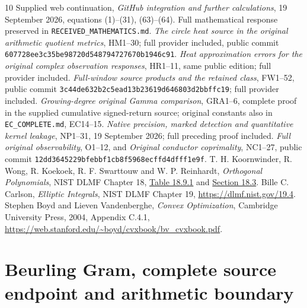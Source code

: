\begin{thebibliography}{10}
 Supplied web continuation, \emph{GitHub integration and further
calculations}, 19 September 2026, equations (1)--(31), (63)--(64).
Full mathematical response preserved in \texttt{RECEIVED\_MATHEMATICS.md}.
 \emph{The circle heat source in the original arithmetic quotient
metrics}, HM1--30; full provider included, public commit
\texttt{607728ee3c35be98720d548794727670b1946c91}.
 \emph{Heat approximation errors for the original complex
observation responses}, HR1--11, same public edition; full provider included.
 \emph{Full-window source products and the retained class},
FW1--52, public commit \texttt{3c44de632b2c5ead13b23619d646803d2bbffc19};
full provider included.
 \emph{Growing-degree original Gamma comparison}, GRA1--6,
complete proof in the supplied cumulative signed-return source;
original constants also in \texttt{EC\_COMPLETE.md}, EC14--15.
 \emph{Native precision, marked detection and quantitative kernel
leakage}, NP1--31, 19 September 2026; full preceding proof included.
 \emph{Full original observability}, O1--12, and
\emph{Original conductor coprimality}, NC1--27, public commit
\texttt{12dd3645229bfebbf1cb8f5968ecffd4dfff1e9f}.
 T. H. Koornwinder, R. Wong, R. Koekoek, R. F. Swarttouw
and W. P. Reinhardt, \emph{Orthogonal Polynomials}, NIST DLMF Chapter 18,
\href{https://dlmf.nist.gov/18.9.T1}{Table 18.9.1} and
\href{https://dlmf.nist.gov/18.3}{Section 18.3}.
 Bille C. Carlson, \emph{Elliptic Integrals}, NIST DLMF
Chapter 19, \url{https://dlmf.nist.gov/19.4}.
 Stephen Boyd and Lieven Vandenberghe,
\emph{Convex Optimization}, Cambridge University Press, 2004, Appendix C.4.1,
\url{https://web.stanford.edu/~boyd/cvxbook/bv_cvxbook.pdf}.
\end{thebibliography}

\endgroup

\clearpage

\begingroup
\providecommand{\C}{\mathbb C}\providecommand{\R}{\mathbb R}
\providecommand{\M}{\mathcal M}\providecommand{\G}{\mathsf G}
\providecommand{\U}{\mathsf U}\providecommand{\E}{\mathsf E}
\newtheorem{egtheorem}{Theorem}
\newtheorem{egproposition}{Proposition}
\newtheorem{eglemma}{Lemma}
\providecommand{\spec}{\operatorname{spec}}\providecommand{\Tr}{\operatorname{Tr}}
\part*{Beurling Gram, complete source endpoint and arithmetic boundary}

